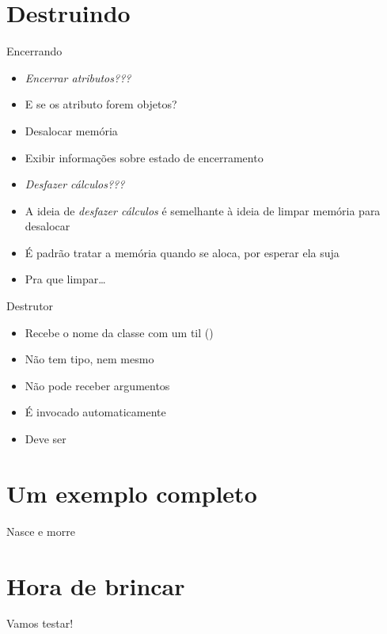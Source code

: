\documentclass[14pt]{beamer}
\begin{document}
	\section{Destruindo}
	\begin{frame}{Encerrando}
		\begin{itemize}
			\presentationPause\item \textit{Encerrar atributos\presentationPause ???}
			\presentationPause\item E se os atributo forem objetos?
			\presentationPause\item Desalocar memória
			\presentationPause\item Exibir informações sobre estado de encerramento
			\presentationPause\item \textit{Desfazer cálculos\presentationPause ???}
			\presentationPause\item A ideia de \emph{desfazer cálculos} é semelhante à ideia de limpar memória para desalocar
			\presentationPause\item É padrão tratar a memória quando se aloca, por esperar ela suja
			\presentationPause\item Pra que limpar\dots
		\end{itemize}
	\end{frame}

	\begin{frame}{Destrutor}
		\begin{itemize}
			\presentationPause\item Recebe o nome da classe \presentationPause com um til (\basicCode{\~})
			\presentationPause\item Não tem tipo\presentationPause, nem mesmo 
			\presentationPause\item Não pode receber argumentos
			\presentationPause\item É invocado automaticamente
			\presentationPause\item Deve ser 
		\end{itemize}
		\presentationPause
	\end{frame}

	\section{Um exemplo completo}
	\begin{frame}{Nasce e morre}
		\presentationPause
	\end{frame}

	\section{Hora de brincar}
		\begin{frame}
			\begin{center}\Huge
				Vamos testar!
			\end{center}
		\end{frame}
	
\end{document}
